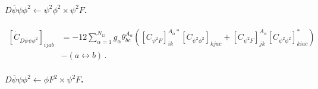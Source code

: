 \paragraph{$D\overline \psi \psi \phi^2 \leftarrow \psi^2\phi^2 \times \psi^2 F$.}

\begin{align}
    \left[\dot C_{D\overline \psi \psi \phi^2}\right]_{ijab} &=-12 \sum_{\alpha=1}^{N_G} g_\alpha \theta^{A_\alpha}_{bc}
    \left(
    \left[C_{\psi^2 F}\right]_{ik}^{A_\alpha *} \left[C_{\psi^2\phi^2}\right]_{kjac} + \left[C_{\psi^2 F}\right]_{jk}^{A_\alpha} \left[C_{\psi^2\phi^2}\right]^*_{kiac}
    \right)\nonumber \\& - (a \leftrightarrow b)\,.
\end{align}

\paragraph{$D\overline \psi \psi \phi^2 \leftarrow \phi F^2 \times \psi^2 F$.}

